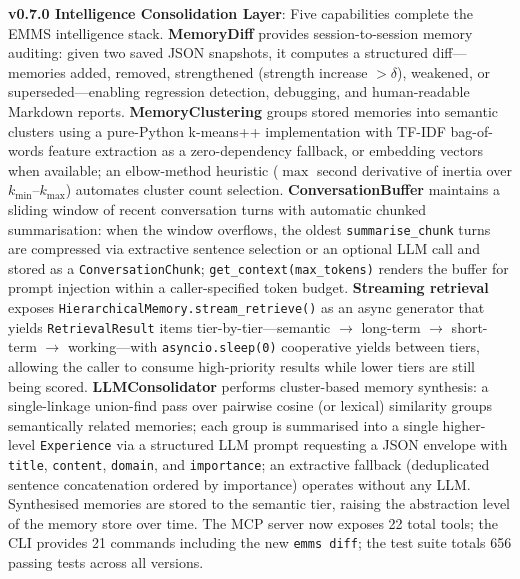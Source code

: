 \documentclass[conference]{IEEEtran}
\begin{document}
\textbf{v0.7.0 Intelligence Consolidation Layer}: Five capabilities complete the EMMS intelligence stack. \textbf{MemoryDiff} provides session-to-session memory auditing: given two saved JSON snapshots, it computes a structured diff---memories added, removed, strengthened (strength increase $> \delta$), weakened, or superseded---enabling regression detection, debugging, and human-readable Markdown reports. \textbf{MemoryClustering} groups stored memories into semantic clusters using a pure-Python k-means++ implementation with TF-IDF bag-of-words feature extraction as a zero-dependency fallback, or embedding vectors when available; an elbow-method heuristic ($\max$ second derivative of inertia over $k_{\min}$--$k_{\max}$) automates cluster count selection. \textbf{ConversationBuffer} maintains a sliding window of recent conversation turns with automatic chunked summarisation: when the window overflows, the oldest \texttt{summarise\_chunk} turns are compressed via extractive sentence selection or an optional LLM call and stored as a \texttt{ConversationChunk}; \texttt{get\_context(max\_tokens)} renders the buffer for prompt injection within a caller-specified token budget. \textbf{Streaming retrieval} exposes \texttt{HierarchicalMemory.stream\_retrieve()} as an async generator that yields \texttt{RetrievalResult} items tier-by-tier---semantic $\to$ long-term $\to$ short-term $\to$ working---with \texttt{asyncio.sleep(0)} cooperative yields between tiers, allowing the caller to consume high-priority results while lower tiers are still being scored. \textbf{LLMConsolidator} performs cluster-based memory synthesis: a single-linkage union-find pass over pairwise cosine (or lexical) similarity groups semantically related memories; each group is summarised into a single higher-level \texttt{Experience} via a structured LLM prompt requesting a JSON envelope with \texttt{title}, \texttt{content}, \texttt{domain}, and \texttt{importance}; an extractive fallback (deduplicated sentence concatenation ordered by importance) operates without any LLM. Synthesised memories are stored to the semantic tier, raising the abstraction level of the memory store over time. The MCP server now exposes 22 total tools; the CLI provides 21 commands including the new \texttt{emms diff}; the test suite totals 656 passing tests across all versions.
\end{document}
